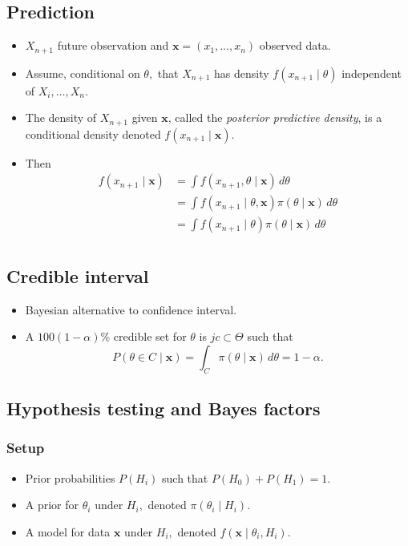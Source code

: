 \documentclass[../ds]{subfiles}
\begin{document}
\subsection{Prediction}
\begin{itemize}
	\item $X_{n+1}$ future observation and $\mathbf{x} = (x_1, \ldots, x_n)$ observed data.
	\item Assume, conditional on $\theta,$ that $X_{n+1}$ has density $f(x_{n+1} \mid \theta)$ independent of $X_i,\ldots,X_n.$
	\item The density of $X_{n+1}$ given $\mathbf{x}$, called the \textit{posterior predictive density}, is a conditional density denoted $f(x_{n+1} \mid \mathbf{x}).$
	\item Then
	\begin{align*}
		f(x_{n+1} \mid \mathbf{x})
		   &= \int f(x_{n+1},\theta \mid \mathbf{x})\,d\theta\\
		   &= \int f(x_{n+1} \mid \theta, \mathbf{x})\pi(\theta \mid \mathbf{x})\,d\theta\\
		   &= \int f(x_{n+1} \mid \theta)\pi(\theta \mid \mathbf{x})\,d\theta\\
	\end{align*}
\end{itemize}

\subsection{Credible interval}
\begin{itemize}
	\item Bayesian alternative to confidence interval.
	\item A $100(1- \alpha)\%$ credible set for $\theta$ is $jc \subset \Theta$ such that
	\[ P(\theta \in C \mid \mathbf{x}) = \int_C \pi (\theta \mid \mathbf{x})\,d\theta = 1-\alpha.\]
\end{itemize}

\subsection{Hypothesis testing and Bayes factors}

\subsubsection{Setup}
\begin{itemize}
	\item Prior probabilities $P(H_i)$ such that $P(H_0) + P(H_1) = 1.$
	\item A prior for $\theta_i$ under $H_i,$ denoted $\pi(\theta_i \mid H_i).$
	\item A model for data $\mathbf{x}$ under $H_i,$ denoted $f(\mathbf{x} \mid \theta_i,H_i).$
\end{itemize}
\end{document}
